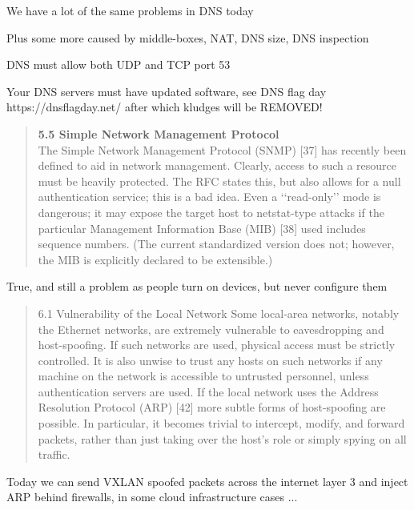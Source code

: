 \documentclass[Screen16to9,17pt]{foils}
\begin{document}
\begin{list1}
\item We have a lot of the same problems in DNS today
\item Plus some more caused by middle-boxes, NAT, DNS size, DNS inspection
\begin{list2}
\item DNS must allow both UDP and TCP port 53
\item Your DNS servers must have updated software, see DNS flag day\\ https://dnsflagday.net/ after which kludges will be REMOVED!
\end{list2}
\end{list1}


\begin{quote}{\bf
5.5 Simple Network Management Protocol}\\
The Simple Network Management Protocol (SNMP) [37] has recently been defined to aid in network
management. Clearly, access to such a resource must be heavily protected. The RFC states this, but
also allows for a null authentication service; this is a bad idea. Even a ‘‘read-only’’ mode is dangerous;
it may expose the target host to netstat-type attacks if the particular Management Information Base
(MIB) [38] used includes sequence numbers. (The current standardized version does not; however, the
MIB is explicitly declared to be extensible.)
\end{quote}

True, and still a problem as people turn on devices, but never configure them


\begin{quote}
6.1 Vulnerability of the Local Network
Some local-area networks, notably the Ethernet networks, are extremely vulnerable to eavesdropping and
host-spoofing. If such networks are used, physical access must be strictly controlled. It is also unwise
to trust any hosts on such networks if any machine on the network is accessible to untrusted personnel,
unless authentication servers are used.
If the local network uses the Address Resolution Protocol (ARP) [42] more subtle forms of host-spoofing
are possible. In particular, it becomes trivial to intercept, modify, and forward packets, rather than just
taking over the host’s role or simply spying on all traffic.
\end{quote}

Today we can send VXLAN spoofed packets across the internet layer 3 and inject ARP behind firewalls, in some cloud infrastructure cases ...
\end{document}
